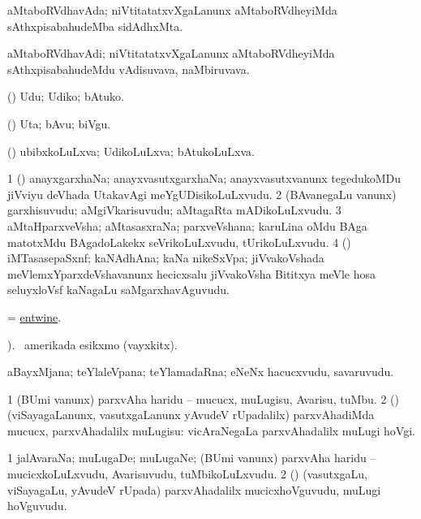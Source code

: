 \bentry
{}
\gl{\nA}
\bmng
aMtaboRVdhavAda; niVtitatatxvXgaLanunx aMtaboRVdheyiMda sAthxpisabahudeMba sidAdhxMta. 
\emng
\eentry

\bentry
{}
\gl{\nA}
\bmng
aMtaboRVdhavAdi; niVtitatatxvXgaLanunx aMtaboRVdheyiMda sAthxpisabahudeMdu vAdisuvava, naMbiruvava. 
\emng
\eentry

\bentry
{}
\gl{\akirx}
\bmng
(\veYshA) Udu; Udiko; bAtuko. 
\emng
\eentry

\bentry
{}
\gl{\nA}
\bmng
(\veYshA) Uta; bAvu; biVgu. 
\emng
\eentry

\bentry
{}
\gl{\gu}
\bmng
(\veYshA) ubibxkoLuLxva; UdikoLuLxva; bAtukoLuLxva. 
\emng
\eentry

\bentry
{}
\gl{\nA}
\bmng
\bnum
\num{1} (\veYshA) anayxgarxhaNa; anayxvasutxgarxhaNa; anayxvasutxvanunx tegedukoMDu jiVviyu deVhada UtakavAgi meYgUDisikoLuLxvudu. 
\num{2} (BAvanegaLu \mo vanunx) garxhisuvudu; aMgiVkarisuvudu; aMtagaRta mADikoLuLxvudu. 
\num{3} aMtaHparxveVsha; aMtasasxraNa; parxveVshana; karuLina oMdu BAga matotxMdu BAgadoLakekx seVrikoLuLxvudu, tUrikoLuLxvudu. 
\num{4} (\savi) iMTasasepaSxnf; kaNAdhAna; kaNa nikeSxVpa; jiVvakoVshada meVlemxYparxdeVshavanunx hecicxsalu jiVvakoVsha Bititxya meVle hosa seluyxloVsf kaNagaLu saMgarxhavAguvudu. 
\enum
\emng
\eentry

\bentry
{}
\gl{\sakirx}
\bmng
= \hyperref{kandict_e.pdf}{E}{entwine}{entwine}. 
\emng
\eentry

\bentry
{}
\gl{\nA}
).\bmng
\kanu\ amerikada esikxmo (vayxkitx). 
\emng
\eentry

\bentry
{}
\gl{\nA}
\bmng
aBayxMjana; teYlaleVpana; teYlamadaRna; eNeNx hacucxvudu, savaruvudu. 
\emng
\eentry

\bentry
{}
\gl{\sakirx}
\bmng
\bnum
\num{1} (BUmi \mo vanunx) parxvAha haridu -- mucucx, muLugisu, Avarisu, tuMbu. 
\num{2} (\rUpa) (viSayagaLanunx, vasutxgaLanunx yAvudeV rUpadalilx) parxvAhadiMda mucucx, parxvAhadalilx muLugisu:  vicAraNegaLa parxvAhadalilx muLugi hoVgi. 
\enum
\emng
\eentry

\bentry
{}
\gl{\nA}
\bmng
\bnum
\num{1} jalAvaraNa; muLugaDe; muLugaNe; (BUmi \mo vanunx) parxvAha haridu -- mucicxkoLuLxvudu, Avarisuvudu, tuMbikoLuLxvudu. 
\num{2} (\rUpa) (vasutxgaLu, viSayagaLu, yAvudeV rUpada) parxvAhadalilx mucicxhoVguvudu, muLugi hoVguvudu. 
\enum
\emng
\eentry

